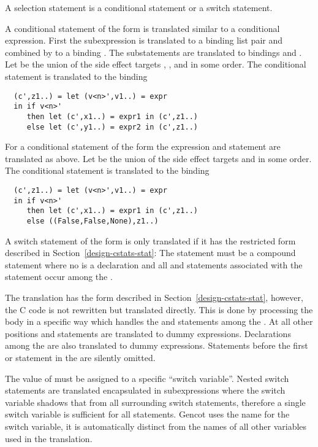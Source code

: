A selection statement is a conditional statement or a switch statement.

A conditional statement of the form  is translated similar to a conditional expression.
First the subexpression  is translated to a binding list pair and combined by  to a binding 
. The substatements are translated to bindings  and . 
Let  be the union of the side effect targets , , and  in some order. The conditional
statement is translated to the binding
\begin{verbatim}
  (c',z1..) = let (v<n>',v1..) = expr
  in if v<n>' 
     then let (c',x1..) = expr1 in (c',z1..)
     else let (c',y1..) = expr2 in (c',z1..)
\end{verbatim}

For a conditional statement of the form  the expression  and statement  are translated as
above. Let  be the union of the side effect targets  and  in some order. The conditional
statement is translated to the binding
\begin{verbatim}
  (c',z1..) = let (v<n>',v1..) = expr
  in if v<n>' 
     then let (c',x1..) = expr1 in (c',z1..)
     else ((False,False,None),z1..)
\end{verbatim}

A switch statement of the form  is only translated if it has the restricted form described in 
Section~\ref{design-cstats-stat}: The statement  must be a compound statement  where no 
is a declaration and all  and  statements associated with the  statement occur among the 
. 

The translation has the form described in Section~\ref{design-cstats-stat}, however, the C code is not rewritten but translated
directly. This is done by processing the body  in a specific way which handles the  and 
statements among the . At all other positions  and  statements are translated to dummy expressions.
Declarations among the  are also translated to dummy expressions. Statements before the first  or 
statement in the  are silently omitted.

The value of  must be assigned to a specific ``switch variable''. Nested switch statements are translated encapsulated 
in subexpressions where the switch variable shadows that from all surrounding switch statements, therefore a single switch variable 
is sufficient for all statements. Gencot uses the name  for the switch variable, it is automatically distinct from the names of
all other variables used in the translation. 

